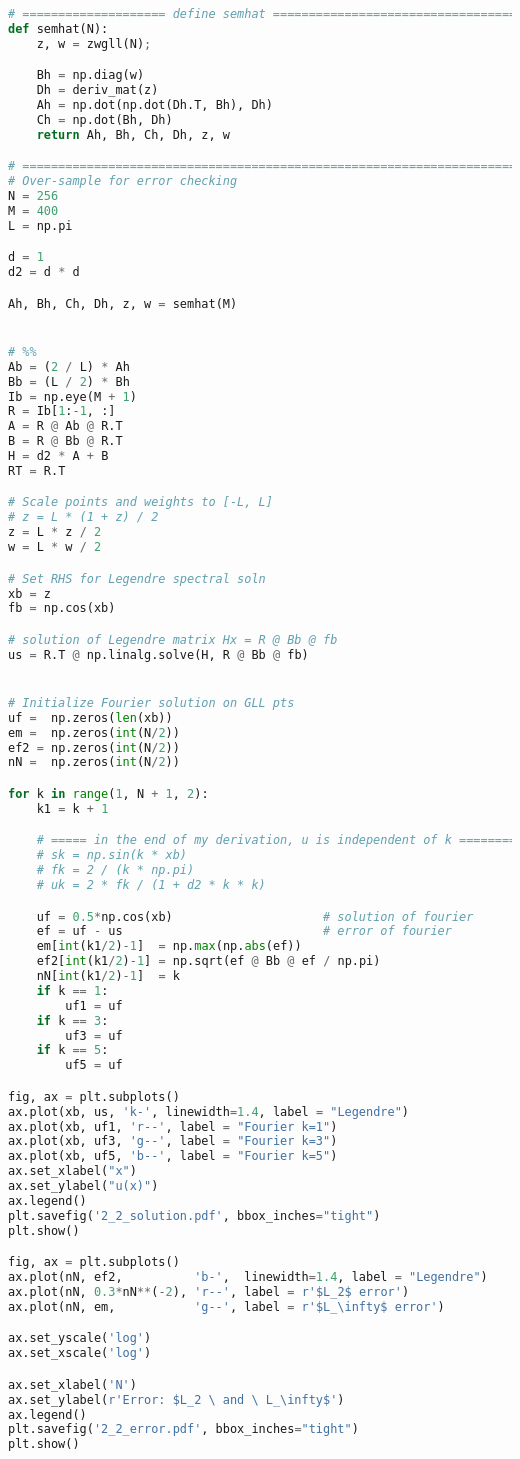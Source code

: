 \documentclass[11pt,letterpaper]{article}
\begin{document}
\begin{lstlisting}[language=Python, caption=Question 2 (b) Python code]
# ==================== define semhat ==================================
def semhat(N):
    z, w = zwgll(N);

    Bh = np.diag(w)
    Dh = deriv_mat(z)
    Ah = np.dot(np.dot(Dh.T, Bh), Dh)
    Ch = np.dot(Bh, Dh)
    return Ah, Bh, Ch, Dh, z, w

# =====================================================================
# Over-sample for error checking
N = 256
M = 400
L = np.pi

d = 1
d2 = d * d

Ah, Bh, Ch, Dh, z, w = semhat(M)


# %%
Ab = (2 / L) * Ah
Bb = (L / 2) * Bh
Ib = np.eye(M + 1)
R = Ib[1:-1, :]
A = R @ Ab @ R.T
B = R @ Bb @ R.T
H = d2 * A + B
RT = R.T

# Scale points and weights to [-L, L]
# z = L * (1 + z) / 2
z = L * z / 2
w = L * w / 2

# Set RHS for Legendre spectral soln
xb = z
fb = np.cos(xb)

# solution of Legendre matrix Hx = R @ Bb @ fb
us = R.T @ np.linalg.solve(H, R @ Bb @ fb)


# Initialize Fourier solution on GLL pts
uf =  np.zeros(len(xb))
em =  np.zeros(int(N/2))
ef2 = np.zeros(int(N/2))
nN =  np.zeros(int(N/2))

for k in range(1, N + 1, 2):
    k1 = k + 1

    # ===== in the end of my derivation, u is independent of k ========
    # sk = np.sin(k * xb)
    # fk = 2 / (k * np.pi)
    # uk = 2 * fk / (1 + d2 * k * k)

    uf = 0.5*np.cos(xb)                     # solution of fourier
    ef = uf - us                            # error of fourier
    em[int(k1/2)-1]  = np.max(np.abs(ef))
    ef2[int(k1/2)-1] = np.sqrt(ef @ Bb @ ef / np.pi)
    nN[int(k1/2)-1]  = k
    if k == 1:
        uf1 = uf
    if k == 3:
        uf3 = uf
    if k == 5:
        uf5 = uf

fig, ax = plt.subplots()
ax.plot(xb, us, 'k-', linewidth=1.4, label = "Legendre")
ax.plot(xb, uf1, 'r--', label = "Fourier k=1")
ax.plot(xb, uf3, 'g--', label = "Fourier k=3")
ax.plot(xb, uf5, 'b--', label = "Fourier k=5")
ax.set_xlabel("x")
ax.set_ylabel("u(x)")
ax.legend()
plt.savefig('2_2_solution.pdf', bbox_inches="tight")
plt.show()

fig, ax = plt.subplots()
ax.plot(nN, ef2,          'b-',  linewidth=1.4, label = "Legendre")
ax.plot(nN, 0.3*nN**(-2), 'r--', label = r'$L_2$ error')
ax.plot(nN, em,           'g--', label = r'$L_\infty$ error')

ax.set_yscale('log')
ax.set_xscale('log')

ax.set_xlabel('N')
ax.set_ylabel(r'Error: $L_2 \ and \ L_\infty$')
ax.legend()
plt.savefig('2_2_error.pdf', bbox_inches="tight")
plt.show()

    \end{lstlisting}
\end{document}
